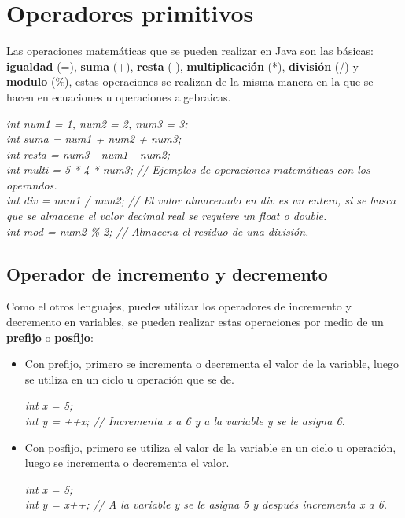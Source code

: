 \section{Operadores primitivos}
\hspace{0.55cm}Las operaciones matemáticas que se pueden realizar en Java son las básicas: \textbf{igualdad} (=), \textbf{suma} (+), \textbf{resta} (-), \textbf{multiplicación} (*), \textbf{división} (/) y \textbf{modulo} (\%), estas operaciones se realizan de la misma manera en la que se hacen en ecuaciones u operaciones algebraicas.
\begin{center}
    \textit{
    		int num1 = 1, num2 = 2, num3 = 3; \\
   		int suma = num1 + num2 + num3; \\
   		int resta = num3 - num1 - num2; \\
   		int multi = 5 * 4 * num3; // Ejemplos de operaciones matemáticas con los operandos. \\
   		int div = num1 / num2; // El valor almacenado en div es un entero, si se busca que se almacene el valor decimal real se requiere un float o double. \\
   		int mod = num2 \% 2; // Almacena el residuo de una división.
   	}
\end{center}


\subsection{Operador de incremento y decremento}
\hspace{0.55cm}Como el otros lenguajes, puedes utilizar los operadores de incremento y decremento en variables, se pueden realizar estas operaciones por medio de un \textbf{prefijo} o \textbf{posfijo}:
\begin{itemize}
    \item Con prefijo, primero se incrementa o decrementa el valor de la variable, luego se utiliza en un ciclo u operación que se de.
    \begin{center}
		\textit{
			int x = 5; \\
			int y = ++x; // Incrementa x a 6 y a la variable y se le asigna 6.
		}
	\end{center}
    \item Con posfijo, primero se utiliza el valor de la variable en un ciclo u operación, luego se incrementa o decrementa el valor.
    \begin{center}
		\textit{
			int x = 5; \\
			int y = x++; // A la variable y se le asigna 5 y después incrementa x a 6.
		}
	\end{center}
\end{itemize}


